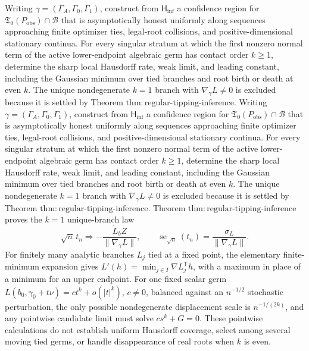 Writing \(\gamma=(\Gamma_A,\Gamma_0,\Gamma_1)\), construct from \(\mathsf H_{\mathrm{inf}}\) a confidence region for \(\mathfrak T_0(P_{\mathrm{obs}})\cap\mathcal B\) that is asymptotically honest uniformly along sequences approaching finite optimizer ties, legal-root collisions, and positive-dimensional stationary continua.  For every singular stratum at which the first nonzero normal term of the active lower-endpoint algebraic germ has contact order \(k\geq1\), determine the sharp local Hausdorff rate, weak limit, and leading constant, including the Gaussian minimum over tied branches and root birth or death at even \(k\).  The unique nondegenerate \(k=1\) branch with \(\nabla_\gamma L\neq0\) is excluded because it is settled by Theorem \(\mathrm{thm{:}regular\text{-}tipping\text{-}inference}\).
Writing \(\gamma=(\Gamma_A,\Gamma_0,\Gamma_1)\), construct from \(\mathsf H_{\mathrm{inf}}\) a confidence region for \(\mathfrak T_0(P_{\mathrm{obs}})\cap\mathcal B\) that is asymptotically honest uniformly along sequences approaching finite optimizer ties, legal-root collisions, and positive-dimensional stationary continua.  For every singular stratum at which the first nonzero normal term of the active lower-endpoint algebraic germ has contact order \(k\geq1\), determine the sharp local Hausdorff rate, weak limit, and leading constant, including the Gaussian minimum over tied branches and root birth or death at even \(k\).  The unique nondegenerate \(k=1\) branch with \(\nabla_\gamma L\neq0\) is excluded because it is settled by Theorem \(\mathrm{thm{:}regular\text{-}tipping\text{-}inference}\).
Theorem \(\mathrm{thm{:}regular\text{-}tipping\text{-}inference}\) proves the \(k=1\) unique-branch law
\[
\sqrt n\,t_n\Longrightarrow
-\frac{\dot L_bZ}{\|\nabla_\gamma L\|},
\qquad
\operatorname{se}_{\sqrt n}(t_n)=\frac{\sigma_L}{\|\nabla_\gamma L\|}.
\]
For finitely many analytic branches \(L_j\) tied at a fixed point, the elementary finite-minimum expansion gives \(L'(h)=\min_{j\in I}\nabla L_j^{\mathsf T}h\), with a maximum in place of a minimum for an upper endpoint.  For one fixed scalar germ \(L(b_0,\gamma_0+t\nu)=ct^k+o(|t|^k)\), \(c\neq0\), balanced against an \(n^{-1/2}\) stochastic perturbation, the only possible nondegenerate displacement scale is \(n^{-1/(2k)}\), and any pointwise candidate limit must solve \(cs^k+G=0\).  These pointwise calculations do not establish uniform Hausdorff coverage, select among several moving tied germs, or handle disappearance of real roots when \(k\) is even.
